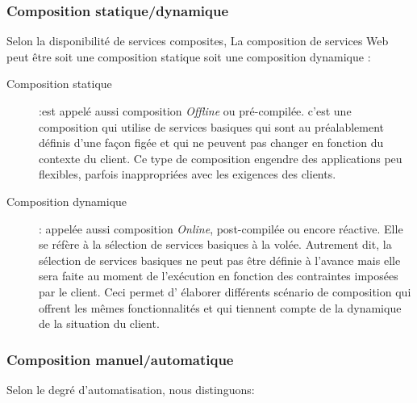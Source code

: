     \subsubsection{Composition statique/dynamique}
    \label{sec:comp-stat}
    Selon la disponibilité de services composites, La composition de
    services Web peut être soit une composition statique soit une
    composition dynamique \cite{driss2011approche}:

    \renewcommand{\descriptionlabel}[1]{\hspace{0.5cm}\textbullet~\textsf{#1}}
    \begin{description}
    \item[Composition statique] :est appelé aussi composition
      \textit{Offline} ou pré-compilée. c'est une composition qui
      utilise de services basiques qui sont au préalablement définis
      d'une façon figée et qui ne peuvent pas changer en fonction du
      contexte du client. Ce type de composition engendre des
      applications peu flexibles, parfois inappropriées avec les
      exigences des clients.

    \item[Composition dynamique]: appelée aussi composition
      \textit{Online}, post-compilée ou encore réactive. Elle se
      réfère à la sélection de services basiques à la volée. Autrement
      dit, la sélection de services basiques ne peut pas être définie
      à l'avance mais elle sera faite au moment de l'exécution en
      fonction des contraintes imposées par le client. Ceci permet d'
      élaborer différents scénario de composition qui offrent les
      mêmes fonctionnalités et qui tiennent compte de la dynamique de
      la situation du client.
    \end{description}
    \enddescription

    \subsubsection{Composition manuel/automatique}
    \label{sec:comp-manu}
    Selon le degré d'automatisation, nous distinguons:

